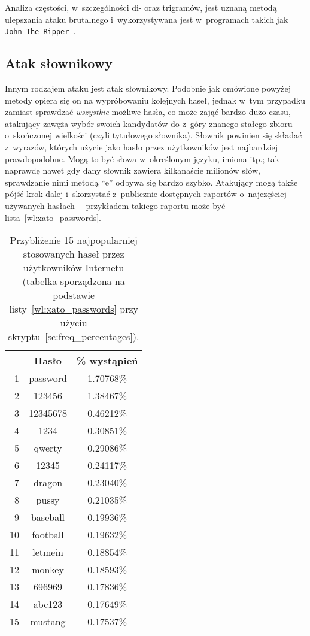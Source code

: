 Analiza częstości, w~szczególności di- oraz trigramów, jest uznaną metodą
ulepszania ataku brutalnego i~wykorzystywana jest w~programach takich jak
\texttt{John The Ripper}~\cite{john_the_ripper_modes}.
\pagebreak



\subsection{Atak słownikowy}
\label{sec:dictionary_attacks}
Innym rodzajem ataku jest atak słownikowy. Podobnie jak omówione powyżej metody
opiera się on na wypróbowaniu kolejnych haseł, jednak w~tym przypadku zamiast
sprawdzać \emph{wszystkie} możliwe hasła, co może zająć bardzo dużo czasu,
atakujący zawęża wybór swoich kandydatów do z~góry znanego stałego zbioru
o~skończonej wielkości (czyli tytułowego słownika). Słownik powinien się
składać z~wyrazów, których użycie jako hasło przez użytkowników jest
najbardziej prawdopodobne. Mogą to być słowa w~określonym języku, imiona itp.;
tak naprawdę nawet gdy dany słownik zawiera kilkanaście milionów słów,
sprawdzanie nimi metodą ``e'' odbywa się bardzo szybko. Atakujący
mogą także pójść krok dalej i~skorzystać z~publicznie dostępnych raportów
o~najczęściej używanych hasłach~-- przykładem takiego raportu może być
lista~\ref{wl:xato_passwords}.

    \begin{table}[htb]
        \caption{Przybliżenie 15 najpopularniej stosowanych haseł przez
        użytkowników Internetu (tabelka sporządzona na podstawie
        listy~\ref{wl:xato_passwords} przy użyciu
        skryptu~\ref{sc:freq_percentages}).}
        \begin{tabular}{|r||c|c|}
            \hline
            & Hasło & \small \% wystąpień \\
            \hline
            1  & password & 1.70768\% \\
            2  & 123456   & 1.38467\% \\
            3  & 12345678 & 0.46212\% \\
            4  & 1234     & 0.30851\% \\
            5  & qwerty   & 0.29086\% \\
            6  & 12345    & 0.24117\% \\
            7  & dragon   & 0.23040\% \\
            8  & pussy & 0.21035\% \\
            9  & baseball & 0.19936\% \\
            10 & football & 0.19632\% \\
            11 & letmein  & 0.18854\% \\
            12 & monkey   & 0.18593\% \\
            13 & 696969   & 0.17836\% \\
            14 & abc123   & 0.17649\% \\
            15 & mustang  & 0.17537\% \\
            \hline
        \end{tabular}
    \end{table}

